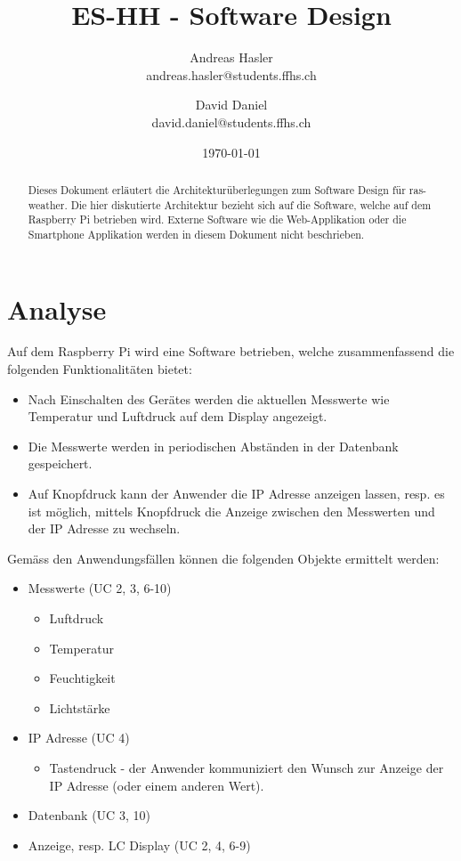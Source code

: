 \documentclass[
    10pt,
    a4paper,
]{scrartcl}
\title{ES-HH - Software Design}
\author{Andreas Hasler \\{\small andreas.hasler@students.ffhs.ch}
\and David Daniel\\{\small david.daniel@students.ffhs.ch}}
\date{\today}
\begin{document}
\maketitle
{}%

\begin{abstract}
    Dieses Dokument erläutert die Architekturüberlegungen zum Software Design für
    ras-weather. Die hier diskutierte Architektur bezieht sich auf die Software, welche
    auf dem Raspberry Pi betrieben wird. Externe Software wie die Web-Applikation oder die
    Smartphone Applikation werden in diesem Dokument nicht beschrieben.
\end{abstract}

\clearpage
{}%
\tableofcontents

\section{Analyse}

Auf dem Raspberry Pi wird eine Software betrieben, welche zusammenfassend
\cite{project-doc} die folgenden Funktionalitäten bietet:
\begin{itemize}
    \item Nach Einschalten des Gerätes werden die aktuellen Messwerte wie Temperatur und
        Luftdruck auf dem Display angezeigt.
    \item Die Messwerte werden in periodischen Abständen in der Datenbank gespeichert.
    \item Auf Knopfdruck kann der Anwender die IP Adresse anzeigen lassen, resp. es ist
        möglich, mittels Knopfdruck die Anzeige zwischen den Messwerten und der IP Adresse
        zu wechseln.
\end{itemize}

Gemäss den Anwendungsfällen \cite{project-doc} können die folgenden Objekte ermittelt
werden:

\begin{itemize}
    \item Messwerte (UC 2, 3, 6-10)
        \begin{itemize}
            \item Luftdruck
            \item Temperatur
            \item Feuchtigkeit
            \item Lichtstärke
        \end{itemize}
    \item IP Adresse (UC 4)
        \begin{itemize}
            \item Tastendruck - der Anwender kommuniziert den Wunsch zur Anzeige der IP
                Adresse (oder einem anderen Wert).
        \end{itemize}
    \item Datenbank (UC 3, 10)
    \item Anzeige, resp. LC Display (UC 2, 4, 6-9)
\end{itemize}
\end{document}
